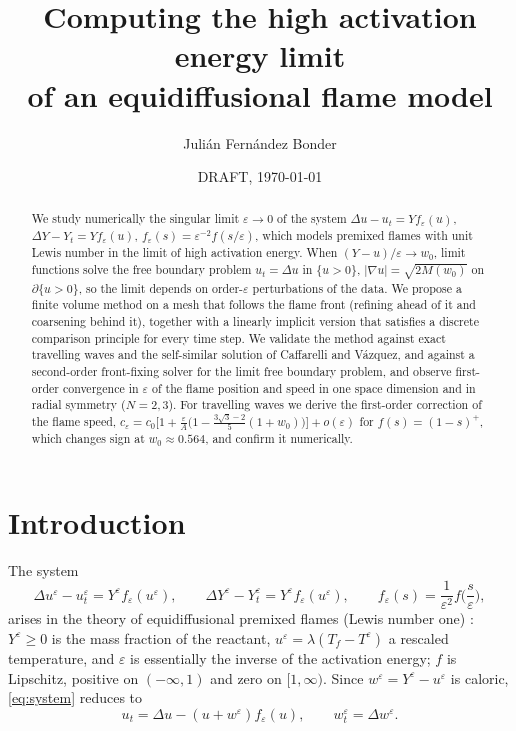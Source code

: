 \documentclass[11pt]{amsart}
\title[Numerics for the high activation energy limit]{Computing the high activation energy limit\\ of an equidiffusional flame model}
\author{Juli\'an Fern\'andez Bonder}
\date{DRAFT, \today}
\theoremstyle{remark}
\newcommand{\ve}{\varepsilon}
\begin{document}
\begin{abstract}
We study numerically the singular limit $\ve\to0$ of the system
$\Delta u-u_t=Yf_\ve(u)$, $\Delta Y-Y_t=Yf_\ve(u)$, $f_\ve(s)=\ve^{-2}f(s/\ve)$,
which models premixed flames with unit Lewis number in the limit of high
activation energy. When $(Y-u)/\ve\to w_0$, limit functions solve the free
boundary problem $u_t=\Delta u$ in $\{u>0\}$, $|\nabla u|=\sqrt{2M(w_0)}$ on
$\partial\{u>0\}$, so the limit depends on order-$\ve$ perturbations of the
data. We propose a finite volume method on a mesh that follows the flame
front (refining ahead of it and coarsening behind it), together with a
linearly implicit version that satisfies a discrete comparison principle for
every time step. We validate the method against exact travelling waves and
the self-similar solution of Caffarelli and V\'azquez, and against a
second-order front-fixing solver for the limit free boundary problem, and
observe first-order convergence in $\ve$ of the flame position and speed in
one space dimension and in radial symmetry ($N=2,3$). For
travelling waves we derive the first-order correction of the flame speed,
$c_\ve=c_0\big[1+\tfrac{\ve}{A}\big(1-\tfrac{3\sqrt3-2}{5}(1+w_0)\big)\big]+o(\ve)$
for $f(s)=(1-s)^+$, which changes sign at $w_0\approx0.564$, and confirm it
numerically.
\end{abstract}

\maketitle

\section{Introduction}

The system
\begin{equation}\label{eq:system}
\Delta u^\ve-u^\ve_t=Y^\ve f_\ve(u^\ve),\qquad
\Delta Y^\ve-Y^\ve_t=Y^\ve f_\ve(u^\ve),\qquad f_\ve(s)=\frac1{\ve^2}f\Big(\frac s\ve\Big),
\end{equation}
arises in the theory of equidiffusional premixed flames (Lewis number one)
\cite{BuckmasterLudford1982,ZeldovichFrankKamenetskii1938}: $Y^\ve\ge0$ is the
mass fraction of the reactant, $u^\ve=\lambda(T_f-T^\ve)$ a rescaled
temperature, and $\ve$ is essentially the inverse of the activation energy;
$f$ is Lipschitz, positive on $(-\infty,1)$ and zero on $[1,\infty)$. Since
$w^\ve=Y^\ve-u^\ve$ is caloric, \eqref{eq:system} reduces to
\begin{equation}\label{eq:Peps}\tag{$P_\ve$}
u_t=\Delta u-(u+w^\ve)f_\ve(u),\qquad w^\ve_t=\Delta w^\ve.
\end{equation}
\end{document}
